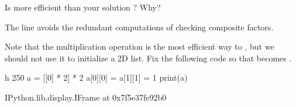 \documentclass[letterpaper,10pt,english]{sphinxmanual}
\begin{document}
 Is  more efficient than your solution ? Why?

\begin{sphinxVerbatim}[commandchars=\\\{\}]
    
\end{sphinxVerbatim}

\begin{sphinxVerbatim}[commandchars=\\\{\}]
    
\end{sphinxVerbatim}

The line  avoids the redundant computations of checking composite factors.

 Note that the multiplication operation \sphinxcode{\sphinxupquote{*}} is the most efficient way to , but we should not use it to initialize a 2D list. Fix the following code so that  becomes \sphinxcode{\sphinxupquote{{[}{[}1, 0{]}, {[}0, 1{]}{]}}}.

\begin{sphinxVerbatim}[commandchars=\\\{\}]
 \PYGZhy{}h 250
a = [[0] * 2] * 2
a[0][0] = a[1][1] = 1
print(a)
\end{sphinxVerbatim}

\begin{sphinxVerbatim}[commandchars=\\\{\}]
\PYGZlt{}IPython.lib.display.IFrame at 0x7f5e37fe92b0\PYGZgt{}
\end{sphinxVerbatim}

\begin{sphinxVerbatim}[commandchars=\\\{\}]
  \PYG{p}{[}\PYG{p}{[}\PYG{p}{]}      \PYG{p}{]}
\PYG{p}{[}\PYG{p}{]}\PYG{p}{[}\PYG{p}{]}  \PYG{p}{[}\PYG{p}{]}\PYG{p}{[}\PYG{p}{]}  
\end{sphinxVerbatim}
\end{document}
